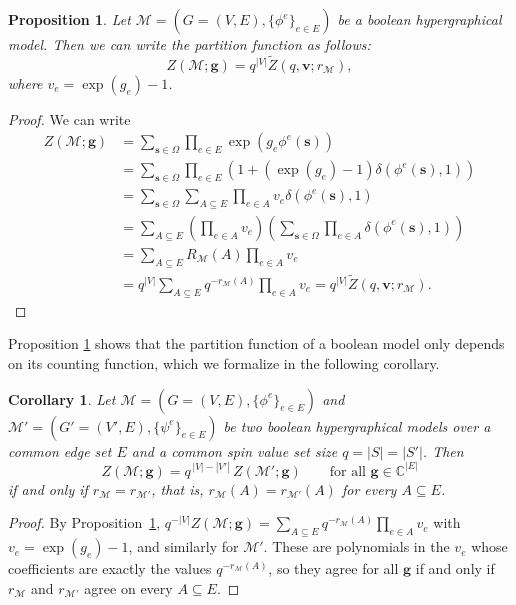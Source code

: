 \documentclass[11pt,reqno]{amsart}
\newcommand{\vecs}{\boldsymbol{s}}
\newcommand{\vecv}{\boldsymbol{v}}
\newcommand{\vecg}{\boldsymbol{g}}
\newcommand{\Mo}{\mathcal{M}}
\newcommand{\statespace}{\Omega}
\theoremstyle{plain}
\newtheorem{proposition}[theorem]{Proposition}
\newtheorem{corollary}[theorem]{Corollary}
\theoremstyle{definition}
\numberwithin{equation}{section}
\begin{document}
\begin{proposition}
    \label{prop:boolmodcountex}
    Let $\Mo = (G = (V,E), \{\phi^e\}_{e \in E} )$ be a boolean hypergraphical model. Then we can write the partition function as follows:
    \[
    Z(\Mo; \vecg) = q^{|V|} \widetilde{Z}(q, \vecv; r_\Mo),
    \]
    where $v_e = \exp(g_e) - 1$.
\end{proposition}
\begin{proof}
    We can write
    \begin{align*}
        Z(\Mo; \vecg) &= \sum_{\vecs \in \statespace} \prod_{e \in E} \exp(g_e \phi^e(\vecs)) \\
        &= \sum_{\vecs \in \statespace} \prod_{e \in E} (1 + (\exp(g_e) -1)\delta(\phi^e(\vecs),1)) \\
        &= \sum_{\vecs \in \statespace} \sum_{A \subseteq E} \prod_{e\in A} v_e \delta(\phi^e(\vecs),1) \\
        &= \sum_{A \subseteq E} \left( \prod_{e\in A} v_e \right) \left( \sum_{\vecs \in \statespace} \prod_{e\in A} \delta(\phi^e(\vecs),1) \right) \\
        &= \sum_{A \subseteq E} R_{\Mo}(A) \prod_{e \in A} v_e \\
        &= q^{|V|}\sum_{A \subseteq E} q^{-r_{\Mo}(A)} \prod_{e \in A} v_e = q^{|V|} \widetilde{Z}(q, \vecv; r_\Mo).
    \end{align*}
\end{proof} 
Proposition \ref{prop:boolmodcountex} shows that the partition function of a boolean model only depends on its counting function, which we formalize in the following corollary.
\begin{corollary}
\label{cor:rank_determines_partition}
Let $\Mo = (G=(V,E), \{\phi^e\}_{e \in E})$ and $\Mo' = (G'=(V',E),
\{\psi^e\}_{e \in E})$ be two boolean hypergraphical models over a common
edge set $E$ and a common spin value set size $q = |S| = |S'|$. Then
\[
    Z(\Mo; \vecg) = q^{\,|V| - |V'|}\, Z(\Mo'; \vecg)
    \qquad \text{for all } \vecg \in \mathbb{C}^{|E|}
\]
if and only if $r_\Mo = r_{\Mo'}$, that is, $r_\Mo(A) = r_{\Mo'}(A)$ for
every $A \subseteq E$.
\end{corollary}
\begin{proof}
By Proposition~\ref{prop:boolmodcountex}, $q^{-|V|} Z(\Mo; \vecg) =
\sum_{A \subseteq E} q^{-r_\Mo(A)} \prod_{e \in A} v_e$ with $v_e =
\exp(g_e) - 1$, and similarly for $\Mo'$. These are polynomials in the
$v_e$ whose coefficients are exactly the values $q^{-r_\Mo(A)}$, so they
agree for all $\vecg$ if and only if $r_\Mo$ and $r_{\Mo'}$ agree on
every $A \subseteq E$.
\end{proof}
\end{document}
